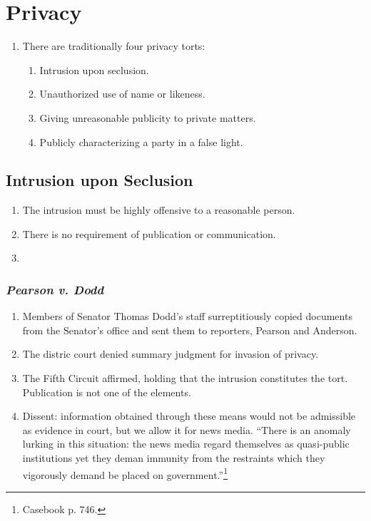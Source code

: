 \section{Privacy}

\begin{enumerate}
    \item There are traditionally four privacy torts:
    \begin{enumerate}
        \item Intrusion upon seclusion.
        \item Unauthorized use of name or likeness.
        \item Giving unreasonable publicity to private matters.
        \item Publicly characterizing a party in a false light.
    \end{enumerate}
\end{enumerate}

\subsection{Intrusion upon Seclusion}

\begin{enumerate}
    \item The intrusion must be highly offensive to a reasonable person.
    \item There is no requirement of publication or communication.
    \item %
\end{enumerate}

\subsubsection{\emph{Pearson v. Dodd}}

\begin{enumerate}
    \item Members of Senator Thomas Dodd's staff surreptitiously copied 
    documents from the Senator's office and sent them to reporters, Pearson 
    and Anderson.
    \item The distric court denied summary judgment for invasion of privacy.
    \item The Fifth Circuit affirmed, holding that the intrusion constitutes
    the tort. Publication is not one of the elements.
    \item Dissent: information obtained through these means would not be 
    admissible as evidence in court, but we allow it for news media. ``There 
    is an anomaly lurking in this situation: the news media regard themselves 
    as quasi-public institutions yet they deman immunity from the restraints 
    which they vigorously demand be placed on government.''\footnote{Casebook 
    p. 746.}
\end{enumerate}

